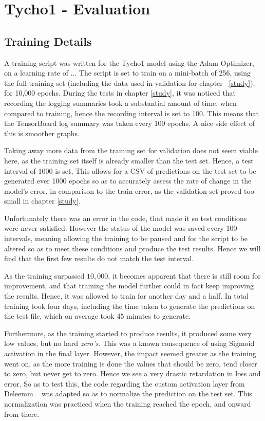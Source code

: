 \documentclass[12pt,a4paper,oneside,oldfontcommands]{memoir}
\begin{document}
\chapter{Tycho1 - Evaluation} \label{tycho1}

\section{Training Details}

A training script was written for the Tycho1 model using the Adam Optimizer, on a learning rate of ... The script is set to train on a mini-batch of 256, using the full training set (including the data used in validation for chapter ~\ref{study}), for 10,000 epochs. During the tests in chapter \ref{study}, it was noticed that recording the logging summaries took a substantial amount of time, when compared to training, hence the recording interval is set to 100. This means that the TensorBoard log summary was taken every 100 epochs. A nice side effect of this is smoother graphs.

Taking away more data from the training set for validation does not seem viable here, as the training set itself is already smaller than the test set. Hence, a test interval of 1000 is set, This allows for a CSV of predictions on the test set to be generated ever 1000 epochs so as to accurately assess the rate of change in the model's error, in comparison to the train error, as the validation set proved too small in chapter \ref{study}. 

Unfortunately there was an error in the code, that made it so test conditions were never satisfied. However the status of the model was saved every 100 intervals, meaning allowing the training to be paused and for the script to be altered so as to meet these conditions and produce the test results. Hence we will find that the first few results do not match the test interval. 

As the training surpassed \(10,000\), it becomes apparent that there is still room for improvement, and that training the model further could in fact keep improving the results. Hence, it was allowed to train for another day and a half. In total training took four days, including the time taken to generate the predictions on the test file, which on average took 45 minutes to generate.

Furthermore, as the training started to produce results, it produced some very low values, but no hard \textit{zero's}. This was a known consequence of using Sigmoid activation in the final layer. However, the impact seemed greater as the training went on, as the more training is done the values that should be zero, tend closer to zero, but never get to zero. Hence we see a very drastic retardation in loss and error. So as to test this, the code regarding the custom activation layer from Deleemm ~\cite{Sanders-GZ} was adapted so as to normalize the prediction on the test set. This normalization was practiced when the training reached the  epoch, and onward from there. 
\end{document}
